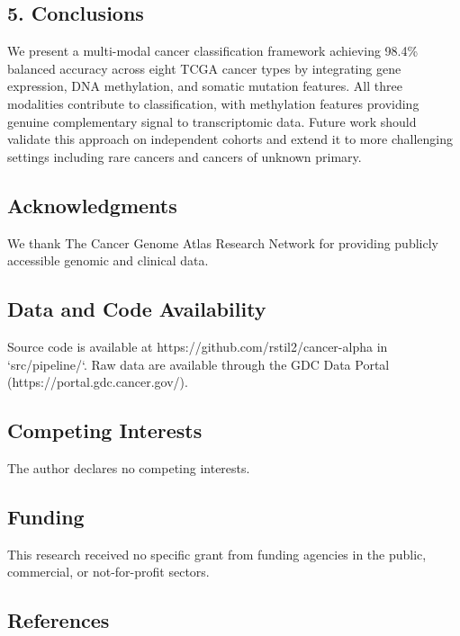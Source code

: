 \subsection{5. Conclusions}\label{conclusions}

We present a multi-modal cancer classification framework achieving
98.4\% balanced accuracy across eight TCGA cancer types by integrating
gene expression, DNA methylation, and somatic mutation features. All
three modalities contribute to classification, with methylation features
providing genuine complementary signal to transcriptomic data. Future
work should validate this approach on independent cohorts and extend it
to more challenging settings including rare cancers and cancers of
unknown primary.

\subsection{Acknowledgments}\label{acknowledgments}

We thank The Cancer Genome Atlas Research Network for providing publicly
accessible genomic and clinical data.

\subsection{Data and Code
Availability}\label{data-and-code-availability}

Source code is available at https://github.com/rstil2/cancer-alpha in
`src/pipeline/`. Raw data are available through the GDC Data Portal
(https://portal.gdc.cancer.gov/).

\subsection{Competing Interests}\label{competing-interests}

The author declares no competing interests.

\subsection{Funding}\label{funding}

This research received no specific grant from funding agencies in the
public, commercial, or not-for-profit sectors.

\subsection{References}\label{references}


